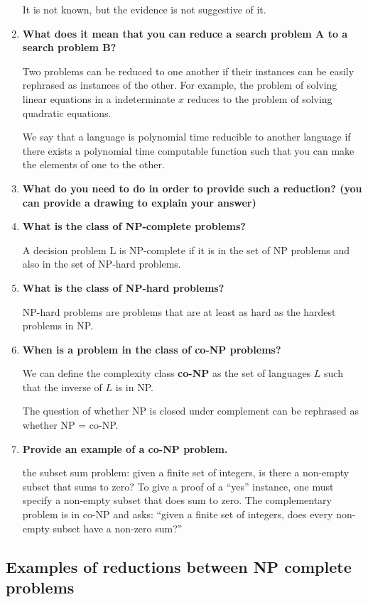 \documentclass[a4paper,11pt]{article}
\begin{document}
\begin{enumerate}
  It is not known, but the evidence is not suggestive of it.
\item
  \textbf{What does it mean that you can reduce a search problem A to a
  search problem B?}

  Two problems can be reduced to one another if their instances can be
  easily rephrased as instances of the other. For example, the problem
  of solving linear equations in a indeterminate $x$ reduces to the
  problem of solving quadratic equations.

  We say that a language is polynomial time reducible to another
  language if there exists a polynomial time computable function such
  that you can make the elements of one to the other.
\item
  \textbf{What do you need to do in order to provide such a reduction?
  (you can provide a drawing to explain your answer)}
\item
  \textbf{What is the class of NP-complete problems?}

  A decision problem L is NP-complete if it is in the set of NP problems
  and also in the set of NP-hard problems.
\item
  \textbf{What is the class of NP-hard problems?}

  NP-hard problems are problems that are at least as hard as the hardest
  problems in NP.
\item
  \textbf{When is a problem in the class of co-NP problems?}

  We can define the complexity class \textbf{co-NP} as the set of
  languages $L$ such that the inverse of $L$ is in NP.

  The question of whether NP is closed under complement can be rephrased
  as whether NP = co-NP.
\item
  \textbf{Provide an example of a co-NP problem.}

  the subset sum problem: given a finite set of integers, is there a
  non-empty subset that sums to zero? To give a proof of a ``yes''
  instance, one must specify a non-empty subset that does sum to zero.
  The complementary problem is in co-NP and asks: ``given a finite set
  of integers, does every non-empty subset have a non-zero sum?''
\end{enumerate}

\subsection{Examples of reductions between NP complete
problems}\label{examples-of-reductions-between-np-complete-problems}
\end{document}
